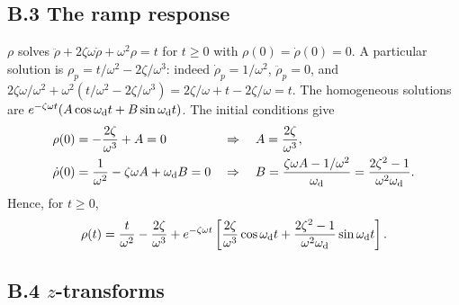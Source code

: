 \subsection*{B.3 The ramp response}

$\rho$ solves $\ddot\rho + 2\zeta\omega\dot\rho + \omega^2\rho = t$ for $t\ge0$ with $\rho(0) =
\dot\rho(0) = 0$. A particular solution is $\rho_p = t/\omega^2 - 2\zeta/\omega^3$: indeed $\dot\rho_p =
1/\omega^2$, $\ddot\rho_p = 0$, and $2\zeta\omega/\omega^2 + \omega^2(t/\omega^2 - 2\zeta/\omega^3) =
2\zeta/\omega + t - 2\zeta/\omega = t$. The homogeneous solutions are $e^{-\zeta\omega t}(A\cos\omega_{\mathrm{d}} t +
B\sin\omega_{\mathrm{d}} t)$. The initial conditions give
\begin{align}
  \rho(0) &= -\frac{2\zeta}{\omega^3} + A = 0 &&\Rightarrow\quad A = \frac{2\zeta}{\omega^3},\\
  \dot\rho(0) &= \frac{1}{\omega^2} - \zeta\omega A + \omega_{\mathrm{d}} B = 0 &&\Rightarrow\quad
  B = \frac{\zeta\omega A - 1/\omega^2}{\omega_{\mathrm{d}}} = \frac{2\zeta^2-1}{\omega^2\omega_{\mathrm{d}}}.
\end{align}
Hence, for $t\ge0$,
\begin{equation}
  \rho(t) = \frac{t}{\omega^2} - \frac{2\zeta}{\omega^3}
  + e^{-\zeta\omega t}\left[\frac{2\zeta}{\omega^3}\cos\omega_{\mathrm{d}} t + \frac{2\zeta^2-1}{\omega^2\omega_{\mathrm{d}}}\sin\omega_{\mathrm{d}} t\right].
\end{equation}

\subsection*{B.4 $z$-transforms}

